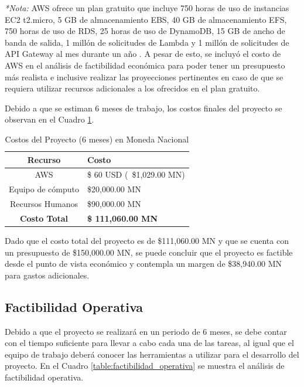 \textit{*Nota:} AWS ofrece un plan gratuito que incluye 750 horas de uso de instancias EC2
t2.micro, 5 GB de almacenamiento EBS, 40 GB de almacenamiento EFS, 750 horas de
uso de RDS, 25 horas de uso de DynamoDB, 15 GB de ancho de banda de salida, 1
millón de solicitudes de Lambda y 1 millón de solicitudes de API Gateway al mes
durante un año \cite{aws_free_2023}. A pesar de esto, se incluyó el costo de AWS
en el análisis de factibilidad económica para poder tener un presupuesto más realista
e inclusive realizar las proyecciones pertinentes en caso de que se requiera
utilizar recursos adicionales a los ofrecidos en el plan gratuito.

Debido a que se estiman 6 meses de trabajo, los costos finales del proyecto
se observan en el Cuadro \ref{table:costos_proyecto}.

\begin{table}[H]
\centering
\begin{tabular}{|c|p{5cm}|}
\hline
\rowcolor{azulclaro}
  \textbf{Recurso} & \centering\textbf{Costo}\arraybackslash \\
\hline
  AWS & \$ 60 USD (~\$1,029.00 MN) \\
\hline
Equipo de cómputo & \$20,000.00 MN\\
\hline
  Recursos Humanos & \$90,000.00 MN \\
\hline
\textbf{Costo Total} & \textbf{\$ 111,060.00 MN} \\
\hline
\end{tabular}
\caption{Costos del Proyecto (6 meses) en Moneda Nacional}
\label{table:costos_proyecto}
\end{table}

Dado que el costo total del proyecto es de \$111,060.00 MN y que se cuenta con
un presupuesto de \$150,000.00 MN, se puede concluir que el proyecto es factible
desde el punto de vista económico y contempla un margen de \$38,940.00 MN para
gastos adicionales.

\subsection{Factibilidad Operativa}

Debido a que el proyecto se realizará en un periodo de 6 meses, se debe
contar con el tiempo suficiente para llevar a cabo cada una de las tareas, al
igual que el equipo de trabajo deberá conocer las herramientas a utilizar para
el desarrollo del proyecto. En el Cuadro \ref{table:factibilidad_operativa} se
muestra el análisis de factibilidad operativa.

